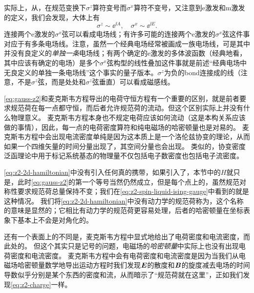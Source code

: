 实际上，从，在规范变换下$\sigma^z$算符变号而$\sigma^x$算符不变号，又注意到e激发和m激发的定义，我们会发现，大体上有
\[
    \sigma^z \sim \ee^{\ii A}, \quad \sigma^x \sim \ee^{\ii E}.
\]
连接两个e激发的$\sigma^x$弦可以看成电场线；有许多可能的连接两个e激发的$\sigma^x$弦这件事对应于有多条电场线。注意，虽然一个经典电场经常被画成一族电场线，可是其中并没有良定义的\emph{单独一条}电场线；有两个确定的e激发的多体波函数（经典地看，其中应该有确定的电场）是多个$\sigma^x$弦构型的线性叠加这件事就是前述“经典电场中无良定义的单独一条电场线”这个事实的量子版本。$\sigma^z$为负的bond连接成的线（注意，不是$\sigma^z$弦，而是处处和$\sigma^z$弦垂直）可以看成磁感线。

\eqref{eq:gauss-z2}和麦克斯韦方程导出的电荷守恒方程有一个重要的区别，就是前者要求规范荷在每一点都守恒，而后者允许规范荷的流动。但这个区别实际上并没有什么物理意义。
麦克斯韦方程本身也不规定电荷应该如何流动（这是本构关系应该做的事情），因此，每一点的电荷密度算符和纯电磁场的哈密顿量也是对易的。
麦克斯韦方程中会出现电流密度单纯是因为这本质上是一个洛伦兹协变的理论，从而如果一个四维矢量的时间分量出现了，其空间分量也会出现。
类似的，协变密度泛函理论中用于标记系统基态的物理量不仅包括电子数密度也包括电子流密度。

\eqref{eq:z2-2d-hamiltonian}中没有引入任何真的携带，如果引入了，本节中的${H}$就只是，此时\eqref{eq:gauss-z2}的第一个等号当然仍然成立，但是每个点上的，虽然规范对称性要求规范荷总量保持不变；我们在\eqref{eq:z2-spin-liquid-ising-gauge}中看到的就是这种情况。
我们将\eqref{eq:z2-2d-hamiltonian}中没有动力学的规范荷称为，这个名称的意味是显然的；它相比有动力学的规范荷更容易处理，后者的哈密顿量在坐标表象下基本上不会是对角化的。

还有一个表面上的不同是，麦克斯韦方程中显式地给出了电荷密度和电流密度，而此处的。
但这个其实只是记号的问题，电磁场的\emph{哈密顿量}中实际上也没有出现电荷密度和电流密度。
麦克斯韦方程中会有电荷密度和电流密度是因为当我们从电磁场哈密顿量数学地导出运动方程时我们发现$\vb*{E}$的散度和$\vb*{B}$的旋度减去电场的时间导数似乎分别是某个东西的密度和流，从而暗示了“规范荷就在这里”，正如我们发现\eqref{eq:z2-charge}一样。

